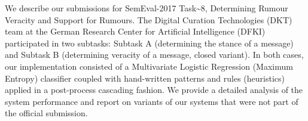 We describe our submissions for SemEval-2017 Task{\textasciitilde}8, Determining Rumour Veracity and Support for Rumours. The Digital Curation Technologies (DKT) team at the German Research Center for Artificial Intelligence (DFKI) participated in two subtasks: Subtask A (determining the stance of a message) and Subtask B (determining veracity of a message, closed variant). In both cases, our implementation consisted of a Multivariate Logistic Regression (Maximum Entropy) classifier coupled with hand-written patterns and rules (heuristics) applied in a post-process cascading fashion. We provide a detailed analysis of the system performance and report on variants of our systems that were not part of the official submission.
